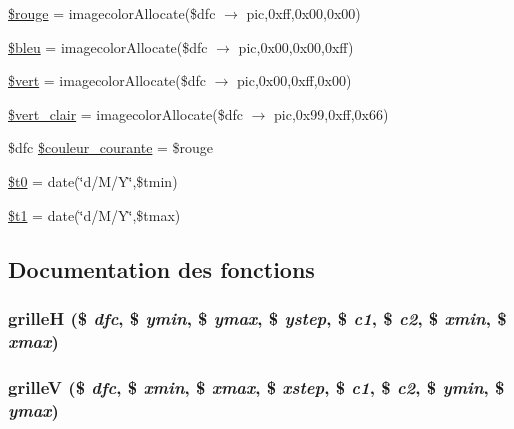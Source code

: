 \begin{CompactItemize}
\item 
\hyperlink{synoptique__tendances_8php_a18}{\$rouge} = imagecolor\-Allocate(\$dfc $\rightarrow$ pic,0xff,0x00,0x00)
\item 
\hyperlink{synoptique__tendances_8php_a19}{\$bleu} = imagecolor\-Allocate(\$dfc $\rightarrow$ pic,0x00,0x00,0xff)
\item 
\hyperlink{synoptique__tendances_8php_a20}{\$vert} = imagecolor\-Allocate(\$dfc $\rightarrow$ pic,0x00,0xff,0x00)
\item 
\hyperlink{synoptique__tendances_8php_a21}{\$vert\_\-clair} = imagecolor\-Allocate(\$dfc $\rightarrow$ pic,0x99,0xff,0x66)
\item 
\$dfc \hyperlink{synoptique__tendances_8php_a22}{\$couleur\_\-courante} = \$rouge
\item 
\hyperlink{synoptique__tendances_8php_a23}{\$t0} = date(\char`\"{}d/M/Y\char`\"{},\$tmin)
\item 
\hyperlink{synoptique__tendances_8php_a24}{\$t1} = date(\char`\"{}d/M/Y\char`\"{},\$tmax)
\end{CompactItemize}


\subsection{Documentation des fonctions}
\hypertarget{synoptique__tendances_8php_a25}{
\subsubsection[grilleH]{\setlength{\rightskip}{0pt plus 5cm}grille\-H (\$ {\em dfc}, \$ {\em ymin}, \$ {\em ymax}, \$ {\em ystep}, \$ {\em c1}, \$ {\em c2}, \$ {\em xmin}, \$ {\em xmax})}}
\label{synoptique__tendances_8php_a25}


\hypertarget{synoptique__tendances_8php_a26}{
\subsubsection[grilleV]{\setlength{\rightskip}{0pt plus 5cm}grille\-V (\$ {\em dfc}, \$ {\em xmin}, \$ {\em xmax}, \$ {\em xstep}, \$ {\em c1}, \$ {\em c2}, \$ {\em ymin}, \$ {\em ymax})}}
\label{synoptique__tendances_8php_a26}




